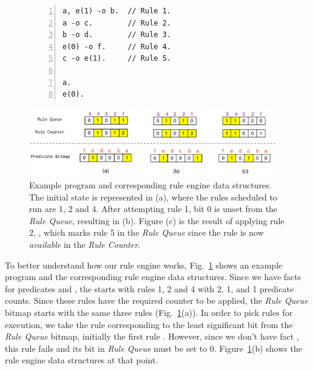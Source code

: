 \begin{figure}[t]
   \begin{center}
\begin{BVerbatim}[numbers=left,fontsize=\codesize]
a, e(1) -o b.  // Rule 1.
a -o c.        // Rule 2.
b -o d.        // Rule 3.
e(0) -o f.     // Rule 4.
c -o e(1).     // Rule 5.

a.
e(0).
\end{BVerbatim}
\end{center}
\vspace{5mm}
   \includegraphics[width=0.96\textwidth]{figures/implementation/rule_queue.pdf}

   \caption{Example program and corresponding rule engine data structures. The
      initial state is represented in (a), where the rules scheduled to run are
      1, 2 and 4. After attempting rule 1, bit 0 is unset from the \emph{Rule
      Queue}, resulting in (b). Figure (c) is the result of applying rule 2,
      , which marks rule 5 in the \emph{Rule Queue} since the rule
      is now \emph{available} in the \emph{Rule Counter}.}

   \label{fig:implementation:rule_engine}
\end{figure}

To better understand how our rule engine works,
Fig.~\ref{fig:implementation:rule_engine} shows an example program and the
corresponding rule engine data structures. Since we have facts for predicates
 and , the  starts with rules 1, 2 and 4 with
2, 1, and 1 predicate counts. Since these rules have the required counter to be
applied, the \emph{Rule Queue} bitmap starts with the same three rules
(Fig.~\ref{fig:implementation:rule_engine}(a)). In order to pick rules for
execution, we take the rule corresponding to the least significant bit from the
\emph{Rule Queue} bitmap, initially the first rule .
However, since we don't have fact , this rule fails and its bit in
\emph{Rule Queue} must be set to 0.
Figure~\ref{fig:implementation:rule_engine}(b) shows the rule engine data
structures at that point.

